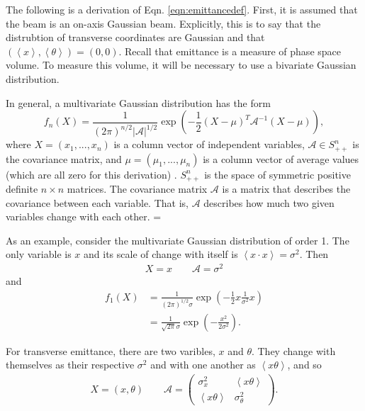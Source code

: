  \label{apx:emittance}

The following is a derivation of Eqn. \ref{eqn:emittancedef}. First, it is assumed that the beam is an on-axis Gaussian beam. Explicitly, this is to say that the distrubtion of transverse coordinates are Gaussian and that $\left(\left<x\right>,\left<\theta\right>\right)=(0,0)$. Recall that emittance is a measure of phase space volume. To measure this volume, it will be necessary to use a bivariate Gaussian distribution.

In general, a multivariate Gaussian distribution has the form
\begin{equation}\nonumber
f_n (X)=\frac{1}{(2\pi)^{n/2}|\mathcal{A}|^{1/2}}\exp\left(-\frac{1}{2}(X-\mu)^T\mathcal{A}^{-1}(X-\mu)\right),
\end{equation}
where $X=(x_1,...,x_n)$ is a column vector of independent variables, $\mathcal{A}\in S^n_{++}$ is the covariance matrix, and $\mu=(\mu_1,...,\mu_n)$ is a column vector of average values (which are all zero for this derivation) \cite{Do}. $S^n_{++}$ is the space of symmetric positive definite $n\times n$ matrices.  The covariance matrix $\mathcal{A}$ is a matrix that describes the covariance between each variable. That is, $\mathcal{A}$ describes how much two given variables change with each other. =

As an example, consider the multivariate Gaussian distribution of order 1. The only variable is $x$ and its scale of change with itself is $\left<x\cdot x\right> = \sigma^2$. Then
\begin{align*}
X=x\qquad\mathcal{A}=\sigma^2
\end{align*}
and
\begin{align*}
f_1 (X)&=\frac{1}{(2\pi)^{1/2}\sigma} \exp\left(-\frac{1}{2}x\frac{1}{\sigma^2}x\right)\\
&=\frac{1}{\sqrt{2\pi}\sigma} \exp\left(-\frac{x^2}{2\sigma^2}\right).
\end{align*}

For transverse emittance, there are two varibles, $x$ and $\theta$. They change with themselves as their respective $\sigma^2$ and with one another as $\left<x\theta\right>$, and so
\begin{align*}
X=(x,\theta)\qquad\mathcal{A}=\begin{pmatrix}
					\sigma_x^2 & \left<x\theta\right>\\
					\left<x\theta\right> & \sigma_\theta^2
					\end{pmatrix}.
\end{align*}

